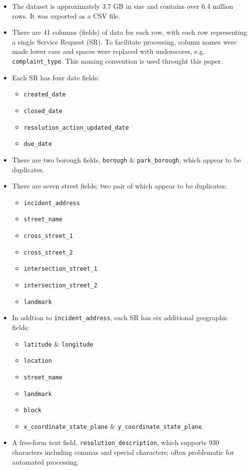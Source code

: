 \documentclass[linenumber]{jdsart}
\begin{document}
\begin{itemize}[left=1.5em]
\item The dataset is approximately 3.7 GB in size and contains 
  over 6.4 million rows. It was exported as a CSV file.

\item There are 41 columns (fields) of data for each row, with each
  row representing a single Service Request (SR). To facilitate 
  processing, column names were made lower case and 
  spaces were replaced with underscores, e.g. \texttt{complaint\_type}. 
  This naming convention is used throught this paper. 
	
\item Each SR has four date fields: 
	\begin{itemize}	
		\item{\texttt{created\_date}}
		\item{\texttt{closed\_date}}
		\item{\texttt{resolution\_action\_updated\_date}}
		\item{\texttt{due\_date}}
	\end{itemize}

\item There are two borough fields, \texttt{borough} \& \texttt{park\_borough}, 
		which appear to be duplicates.
  
\item There are seven street fields; two pair of which appear to be duplicates:
	\begin{itemize}
		\item{\texttt{incident\_address}}
		\item{\texttt{street\_name}}
		\item{\texttt{cross\_street\_1}}
		\item{\texttt{cross\_street\_2}}
		\item{\texttt{intersection\_street\_1}}
		\item{\texttt{intersection\_street\_2}}
		\item{\texttt{landmark}}
	\end{itemize}
          
\item In addtion to \texttt{incident\_address}, each SR has six
	additional geographic fields:
	\begin{itemize}
		\item{\texttt{latitude} \& \texttt{longitude}}
		\item{\texttt{location}}
		\item{\texttt{street\_name}}
		\item{\texttt{landmark}}
		\item{\texttt{block}}
		\item{\texttt{x\_coordinate\_state\_plane} \& \texttt{y\_coordinate\_state\_plane}}.
 	\end{itemize}
	
\item A free-form text field, \texttt{resolution\_description}, which 
  supports 930 characters including commas and 
  special characters; often problematic for automated processing.
\end{itemize}
\medskip
\end{document}
